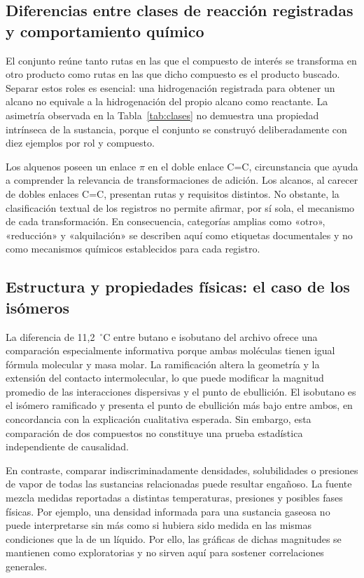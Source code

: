 \subsection{Diferencias entre clases de reacción registradas y comportamiento químico}
El conjunto reúne tanto rutas en las que el compuesto de interés se transforma en otro producto como rutas en las que dicho compuesto es el producto buscado. Separar estos roles es esencial: una hidrogenación registrada para obtener un alcano no equivale a la hidrogenación del propio alcano como reactante. La asimetría observada en la Tabla~\ref{tab:clases} no demuestra una propiedad intrínseca de la sustancia, porque el conjunto se construyó deliberadamente con diez ejemplos por rol y compuesto.

Los alquenos poseen un enlace $\pi$ en el doble enlace C=C, circunstancia que ayuda a comprender la relevancia de transformaciones de adición. Los alcanos, al carecer de dobles enlaces C=C, presentan rutas y requisitos distintos. No obstante, la clasificación textual de los registros no permite afirmar, por sí sola, el mecanismo de cada transformación. En consecuencia, categorías amplias como «otro», «reducción» y «alquilación» se describen aquí como etiquetas documentales y no como mecanismos químicos establecidos para cada registro.

\subsection{Estructura y propiedades físicas: el caso de los isómeros}
La diferencia de 11,2~$^\circ$C entre butano e isobutano del archivo ofrece una comparación especialmente informativa porque ambas moléculas tienen igual fórmula molecular y masa molar. La ramificación altera la geometría y la extensión del contacto intermolecular, lo que puede modificar la magnitud promedio de las interacciones dispersivas y el punto de ebullición. El isobutano es el isómero ramificado y presenta el punto de ebullición más bajo entre ambos, en concordancia con la explicación cualitativa esperada. Sin embargo, esta comparación de dos compuestos no constituye una prueba estadística independiente de causalidad.

En contraste, comparar indiscriminadamente densidades, solubilidades o presiones de vapor de todas las sustancias relacionadas puede resultar engañoso. La fuente mezcla medidas reportadas a distintas temperaturas, presiones y posibles fases físicas. Por ejemplo, una densidad informada para una sustancia gaseosa no puede interpretarse sin más como si hubiera sido medida en las mismas condiciones que la de un líquido. Por ello, las gráficas de dichas magnitudes se mantienen como exploratorias y no sirven aquí para sostener correlaciones generales.

